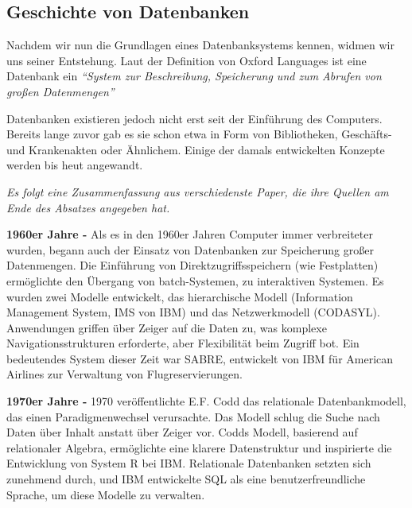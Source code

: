 \subsection{Geschichte von Datenbanken}

Nachdem wir nun die Grundlagen eines Datenbanksystems kennen, widmen wir uns seiner Entstehung. Laut der Definition von Oxford Languages ist eine Datenbank ein 
\textit{\enquote{System zur Beschreibung, Speicherung und zum Abrufen von großen Datenmengen}} \cite{Definition:Datenbank}

\noindent Datenbanken existieren jedoch nicht erst seit der Einführung des Computers. Bereits lange zuvor gab es sie schon etwa in Form von Bibliotheken, Geschäfts- und Krankenakten oder Ähnlichem. Einige der damals entwickelten Konzepte werden bis heut angewandt.

\vspace{3mm}\noindent \textit{Es folgt eine Zusammenfassung aus verschiedenste Paper, die ihre Quellen am Ende des Absatzes angegeben hat.}

\vspace{3mm}\noindent \textbf{1960er Jahre -}
Als es in den 1960er Jahren Computer immer verbreiteter wurden, begann auch der Einsatz von Datenbanken zur Speicherung großer Datenmengen. Die Einführung von Direktzugriffsspeichern (wie Festplatten) ermöglichte den Übergang von batch-Systemen, zu interaktiven Systemen. Es wurden zwei Modelle entwickelt, das hierarchische Modell (Information Management System, IMS von IBM) und das Netzwerkmodell (CODASYL). Anwendungen griffen über Zeiger auf die Daten zu, was komplexe Navigationsstrukturen erforderte, aber Flexibilität beim Zugriff bot. Ein bedeutendes System dieser Zeit war SABRE, entwickelt von IBM für American Airlines zur Verwaltung von Flugreservierungen.  \cite{Paper:Geschichte3} \cite{Paper:Geschichte4} \cite{Paper:Geschichte1}

\vspace{3mm}\noindent \textbf{1970er Jahre -}
 1970 veröffentlichte E.F. Codd das relationale Datenbankmodell, das einen \newline\gls{Paradigmenwechsel} verursachte. Das Modell schlug die Suche nach Daten über Inhalt anstatt über Zeiger vor. Codds Modell, basierend auf relationaler Algebra, ermöglichte eine klarere Datenstruktur und inspirierte die Entwicklung von \gls{System R} bei IBM. Relationale Datenbanken setzten sich zunehmend durch, und IBM entwickelte \gls{SQL}  als eine benutzerfreundliche Sprache, um diese Modelle zu verwalten.
\cite{Paper:Geschichte1}\cite{Paper:Geschichte2}

